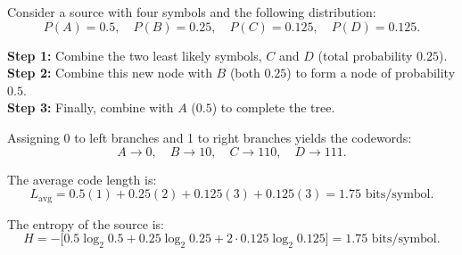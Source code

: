 \documentclass[11pt]{article}
\begin{document}











Consider a source with four symbols and the following distribution:
\[
P(A) = 0.5,\quad P(B) = 0.25,\quad P(C) = 0.125,\quad P(D) = 0.125.
\]

\textbf{Step 1:} Combine the two least likely symbols, \(C\) and \(D\) (total probability \(0.25\)). \\
\textbf{Step 2:} Combine this new node with \(B\) (both \(0.25\)) to form a node of probability \(0.5\). \\
\textbf{Step 3:} Finally, combine with \(A\) (\(0.5\)) to complete the tree.

Assigning 0 to left branches and 1 to right branches yields the codewords:
\[
A \to 0,\quad B \to 10,\quad C \to 110,\quad D \to 111.
\]

The average code length is:
\[
L_{\text{avg}} = 0.5(1) + 0.25(2) + 0.125(3) + 0.125(3) = 1.75 \text{ bits/symbol}.
\]

The entropy of the source is:
\[
H = -\big[0.5\log_2 0.5 + 0.25\log_2 0.25 + 2\cdot0.125\log_2 0.125\big] = 1.75 \text{ bits/symbol}.
\]
\end{document}
